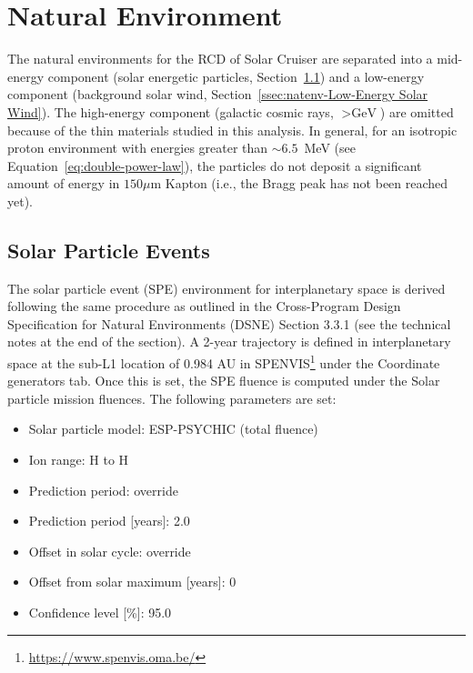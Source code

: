 \documentclass{hitec}
\begin{document}
\section{Natural Environment}

The natural environments for the RCD of Solar Cruiser are separated into a mid-energy component (solar energetic particles, Section~\ref{ssec:natenv-Solar Particle Events}) and a low-energy component (background solar wind, Section~\ref{ssec:natenv-Low-Energy Solar Wind}). The high-energy component (galactic cosmic rays, $> \text{GeV}$) are omitted because of the thin materials studied in this analysis. In general, for an isotropic proton environment with energies greater than $\sim 6.5$~MeV (see Equation~\eqref{eq:double-power-law}), the particles do not deposit a significant amount of energy in $150 \mu$m Kapton (i.e., the Bragg peak has not been reached yet).


\subsection{Solar Particle Events}
\label{ssec:natenv-Solar Particle Events}

The solar particle event (SPE) environment for interplanetary space is derived following the same procedure as outlined in the Cross-Program Design Specification for Natural Environments (DSNE) Section 3.3.1 (see the technical notes at the end of the section). A 2-year trajectory is defined in interplanetary space at the sub-L1 location of 0.984 AU in SPENVIS\footnote{\url{https://www.spenvis.oma.be/}} under the \textsf{Coordinate generators} tab. Once this is set, the SPE fluence is computed under the \textsf{Solar particle mission fluences}. The following parameters are set:
\begin{itemize}
	\item Solar particle model: ESP-PSYCHIC (total fluence)
	\item Ion range: H to H
	\item Prediction period: override
	\item Prediction period [years]: 2.0
	\item Offset in solar cycle: override
	\item Offset from solar maximum [years]: 0
	\item Confidence level [\%]: 95.0
\end{itemize}
\end{document}
